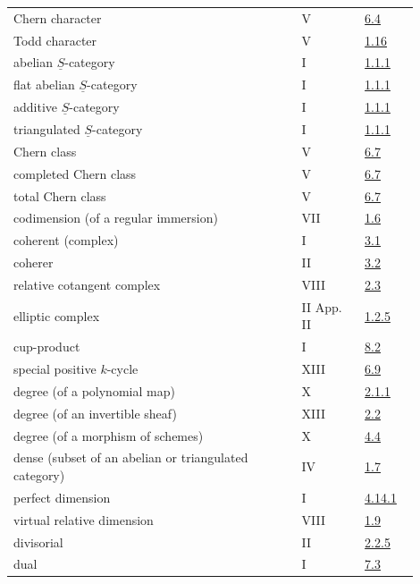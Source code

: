 \begin{longtable}{@{}>{\raggedright\arraybackslash}p{0.64\linewidth}>{\raggedright\arraybackslash}p{0.14\linewidth}>{\raggedright\arraybackslash}p{0.12\linewidth}@{}}
Chern character & V & \hyperlink{sga6.e05.def.6-4}{6.4}\\
Todd character & V & \hyperlink{sga6.e05.para.1-16}{1.16}\\
abelian \(\underline S\)-category & I & \hyperlink{sga6.e01.para.1-1-1}{1.1.1}\\
flat abelian \(\underline S\)-category & I & \hyperlink{sga6.e01.para.1-1-1}{1.1.1}\\
additive \(\underline S\)-category & I & \hyperlink{sga6.e01.para.1-1-1}{1.1.1}\\
triangulated \(\underline S\)-category & I & \hyperlink{sga6.e01.para.1-1-1}{1.1.1}\\
Chern class & V & \hyperlink{sga6.e05.para.6-7}{6.7}\\
completed Chern class & V & \hyperlink{sga6.e05.para.6-7}{6.7}\\
total Chern class & V & \hyperlink{sga6.e05.para.6-7}{6.7}\\
codimension (of a regular immersion) & VII & \hyperlink{sga6.e07.def.1-6}{1.6}\\
coherent (complex) & I & \hyperlink{sga6.e01.def.3-1}{3.1}\\
coherer & II & \hyperlink{sga6.e02.sec.3.2}{3.2}\\
relative cotangent complex & VIII & \hyperlink{sga6.e08.def.2-3}{2.3}\\
elliptic complex & II App. II & \hyperlink{sga6.e02.para.1-2-5}{1.2.5}\\
cup-product & I & \hyperlink{sga6.e01.para.8-2}{8.2}\\
special positive \(k\)-cycle & XIII & \hyperlink{sga6.e13.def.6-9}{6.9}\\
degree (of a polynomial map) & X & \hyperlink{sga6.e10.def.2-1-1}{2.1.1}\\
degree (of an invertible sheaf) & XIII & \hyperlink{sga6.e13.para.2-2}{2.2}\\
degree (of a morphism of schemes) & X & \hyperlink{sga6.e10.sec.4.4}{4.4}\\
dense (subset of an abelian or triangulated category) & IV & \hyperlink{sga6.e04.def.1-7}{1.7}\\
perfect dimension & I & \hyperlink{sga6.e01.def.4-14-1}{4.14.1}\\
virtual relative dimension & VIII & \hyperlink{sga6.e08.def.1-9}{1.9}\\
divisorial & II & \hyperlink{sga6.e02.def.2-2-5}{2.2.5}\\
dual & I & \hyperlink{sga6.e01.def.7-3}{7.3}\\

\end{longtable}

